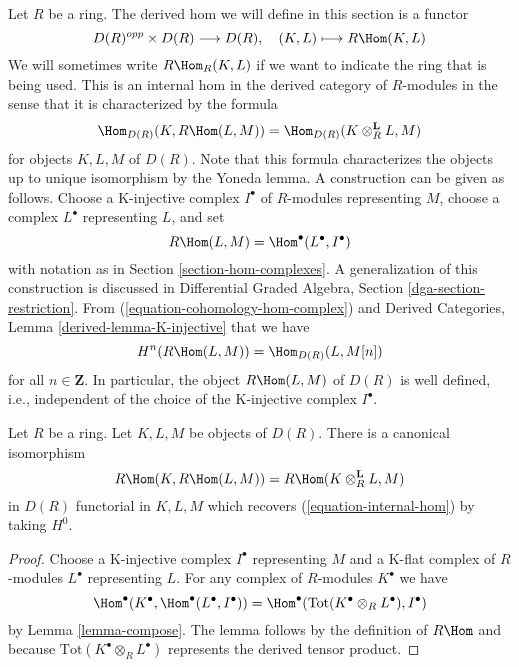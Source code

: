 \noindent
Let $R$ be a ring. The derived hom we will define in this section is a functor
$$
D(R)^{opp} \times D(R) \longrightarrow D(R),\quad
(K, L) \longmapsto R\Hom(K, L)
$$
We will sometimes write $R\Hom_R(K, L)$ if we want to indicate the
ring that is being used. This is an internal hom in the derived category of
$R$-modules in the sense that it is characterized by the formula
\begin{equation}
\label{equation-internal-hom}
\Hom_{D(R)}(K, R\Hom(L, M))
=
\Hom_{D(R)}(K \otimes_R^\mathbf{L} L, M)
\end{equation}
for objects $K, L, M$ of $D(R)$. Note that this formula characterizes
the objects up to unique isomorphism by the Yoneda lemma. A construction
can be given as follows. Choose a K-injective complex $I^\bullet$
of $R$-modules representing $M$, choose a complex $L^\bullet$
representing $L$, and set
$$
R\Hom(L, M) = \Hom^\bullet(L^\bullet, I^\bullet)
$$
with notation as in Section \ref{section-hom-complexes}.
A generalization of this construction is discussed in
Differential Graded Algebra, Section \ref{dga-section-restriction}.
From (\ref{equation-cohomology-hom-complex}) and
Derived Categories, Lemma \ref{derived-lemma-K-injective}
that we have
\begin{equation}
\label{equation-h0-RHom}
H^n(R\Hom(L, M)) = \Hom_{D(R)}(L, M[n])
\end{equation}
for all $n \in \mathbf{Z}$. In particular, the object
$R\Hom(L, M)$ of $D(R)$ is well defined, i.e., independent of
the choice of the K-injective complex $I^\bullet$.

\begin{lemma}
\label{lemma-internal-hom}
Let $R$ be a ring. Let $K, L, M$ be objects of $D(R)$. There is a canonical
isomorphism
$$
R\Hom(K, R\Hom(L, M)) = R\Hom(K \otimes_R^\mathbf{L} L, M)
$$
in $D(R)$ functorial in $K, L, M$ which recovers
(\ref{equation-internal-hom}) by taking $H^0$.
\end{lemma}

\begin{proof}
Choose a K-injective complex $I^\bullet$ representing
$M$ and a K-flat complex of $R$-modules $L^\bullet$
representing $L$. For any complex of $R$-modules $K^\bullet$
we have
$$
\Hom^\bullet(K^\bullet, \Hom^\bullet(L^\bullet, I^\bullet)) =
\Hom^\bullet(\text{Tot}(K^\bullet \otimes_R L^\bullet), I^\bullet)
$$
by Lemma \ref{lemma-compose}. The lemma follows by the definition
of $R\Hom$ and because
$\text{Tot}(K^\bullet \otimes_R L^\bullet)$
represents the derived tensor product.
\end{proof}

